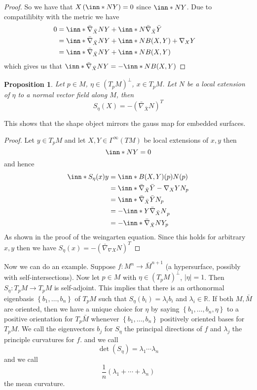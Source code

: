 \documentclass[a4paper]{article}
\newtheorem*{prop}{Proposition}
\begin{document}
\begin{proof}
  So we have that $X \left( \inn*{N}{Y} \right) = 0$ since $\inn*{N}{Y}$. Due to compatilibity  with the metric we have
  \[
    \begin{aligned}
      0 &= \inn*{\bar{\nabla}_{\bar{X}} N}{Y} + \inn*{N}{\bar{\nabla}_{\bar{X}}\bar{Y}} \\
        &= \inn*{\bar{\nabla}_{\bar{X}} N}{Y} + \inn*{N}{B(X,Y) + \nabla_X Y} \\
        &= \inn*{\bar{\nabla}_{\bar{X}} N}{Y} + \inn*{N}{B(X,Y)}
                                                                                 &
    \end{aligned}
  \]
  which gives us that $\inn*{\bar{\nabla}_{\bar{X}} N}{Y} = - \inn*{N}{B(X,Y)}$
\end{proof}

\begin{prop}
  Let $p \in M$, $\eta \in (T_pM)^\perp$, $x \in T_pM$. Let $N$ be a local extension of $\eta$ to a normal vector field along $M$,  then 
  \[
    S_\eta(X) = - (\bar{\nabla}_{\bar{X}} N)^T
  \]
\end{prop}
This shows that the shape object mirrors the gauss map for embedded surfaces.
\begin{proof}
  Let $y  \in T_pM$ and let $X,Y \in \Gamma^\infty(TM)$ be local extensions of $x,y$ then
  \[
    \inn*{N}{Y} = 0
  \]
  and hence
  \[
    \begin{aligned}
      \inn*{S_\eta(x)}{y} &= \inn*{B(X,Y)(p)}{N(p)} \\
                          &= \inn*{\bar{\nabla}_{\bar{X}}\bar{Y} - \nabla_X Y}{N}_p \\
                          &= \inn*{\bar{\nabla}_{\bar{X}}\bar{Y}}{N}_p \\
                          &= -\inn*{Y}{\bar{\nabla}_{\bar{X}} N}_p \\
                          &= -\inn*{\bar{\nabla}_{\bar{X}} N}{Y}_p
    \end{aligned}
  \]
  As shown in the proof of the weingarten equation. Since this holds for arbitrary $x,y$ then we have $S_\eta(x) = -(\bar{\nabla}_{\nabla{X}}N)^T$
\end{proof}

Now we can do an example. Suppose $f:M^n \rightarrow \bar{M}^{n+1}$ (a hypersurface, possibly with self-intersections). Now let $p \in M$ with $\eta \in (T_pM)^\perp$, $|\eta| = 1$. Then $S_\eta: T_pM \rightarrow T_pM$ is self-adjoint. This implies that there is an orthonormal eigenbasis $\left\{ b_1, \dots, b_n \right\}$ of $T_pM$ such that $S_\eta(b_i) = \lambda_i b_i$ and $\lambda_i \in \mathds{R}$. If both $M, \bar{M}$ are oriented, then we have a unique choice for $\eta$ by saying $\left\{ b_1, \dots, b_n, \eta \right\}$ to a positive orientation for $T_p\bar{M}$ whenever $\left\{ b_1, \dots, b_n \right\}$ positively oriented bases for $T_pM$. We call the eigenvectors $b_j$ for $S_\eta$ the principal directions of $f$ and $\lambda_j$ the principle curvatures for $f$. and we call
\[
  \det (S_\eta) = \lambda_1 \cdots \lambda_n
\]
and we call 
\[
  \frac{1}{n}\left( \lambda_1 + \cdots + \lambda_n \right)
\]
the mean curvature.
\end{document}
